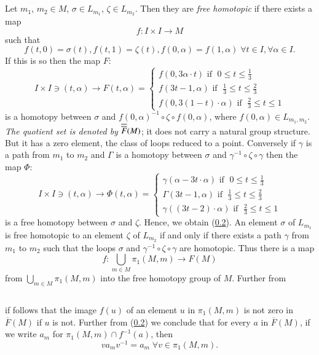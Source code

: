 \subsection{}\label{chap7:7.6.2}

\begin{defi*}
Let $m_{1}$, $m_{2}\in M$, $\sigma\in L_{m_{1}}$, $\zeta\in
L_{m_{2}}$. Then they are {\em free homotopic} if there exists a map
$$
f:I\times I\to M
$$
such that
$$
f(t,0)=\sigma(t),f(t,1)=\zeta(t),f(0,\alpha)=f(1,\alpha) \; \forall t\in
I, \forall \alpha \in I.
$$
If this is so then the map $F$:
$$
I\times I\ni (t,\alpha)\to F(t,\alpha)=
\begin{cases}
f(0,3\alpha\cdot t)\text{ if } \; 0\leq t\leq \frac{1}{3}\\
f(3t-1,\alpha)\text{ if } \; \frac{1}{3}\leq t\leq \frac{2}{3}\\
f(0,3(1-t)\cdot\alpha)\text{ if } \; \frac{2}{3}\leq t\leq 1
\end{cases}
$$
is a homotopy between $\sigma$ and $f(0,\alpha)^{-1}\circ\zeta\circ
f(0,\alpha)$, where $f(0,\alpha)\in L_{m_{1},m_{2}}$. {\em The
  quotient set is denoted by} $\overline{\overline{F}}(M)$; it does not carry a
natural group structure. But it has a zero element, the class of loops
reduced to a point. Conversely if $\gamma$ is a path from $m_{1}$ to
$m_{2}$ and $\Gamma$ is a homotopy between $\sigma$ and
$\gamma^{-1}\circ \zeta\circ\gamma$ then the map $\Phi$:
$$
I\times I\ni (t,\alpha)\to \Phi(t,\alpha)=
\begin{cases}
\gamma(\alpha-3t\cdot\alpha)\text{ if } \;0\leq t\leq \frac{1}{3}\\
\Gamma(3t-1,\alpha)\text{ if }\; \frac{1}{3}\leq t\leq \frac{2}{3}\\
\gamma((3t-2)\cdot\alpha)\text{ if } \;\frac{2}{3}\leq t\leq 1
\end{cases}
$$
is a free homotopy between $\sigma$ and $\zeta$. Hence, we obtain
(\ref{chap7:7.6.3}). An element $\sigma$ of $L_{m_{1}}$ is free homotopic to
an element $\zeta$ of $L_{m_{2}}$ if and only if there exists a path
$\gamma$ from $m_{1}$ to $m_{2}$ such that the loops $\sigma$ and
$\gamma^{-1}\circ \zeta\circ \gamma$ are homotopic. Thus there is a
map
$$
f:\bigcup_{m\in M}\pi_{1}(M,m)\to F(M)
$$
from \pageoriginale $\bigcup\limits_{m\in M}\pi_{1}(M,m)$ into the
free homotopy group of $M$. Further from  
\end{defi*}

\setcounter{subsection}{2}
\subsection{}\label{chap7:7.6.3}
if follows that the image $f(u)$ of an element $u$ in $\pi_{1}(M,m)$
is not zero in $\overline{F}(M)$ if $u$ is not. Further from
(\ref{chap7:7.6.3}) we conclude that for every $a$ in $\overline{F}(M)$, if
we write $a_{m}$ for $\pi_{1}(M,m)\cap f^{-1}(a)$, then 
\begin{equation*}
va_{m}v^{-1}=a_{m} \; \forall v\in \pi_{1}(M,m).\tag{7.6.4}\label{chap7:7.6.4}
\end{equation*}

